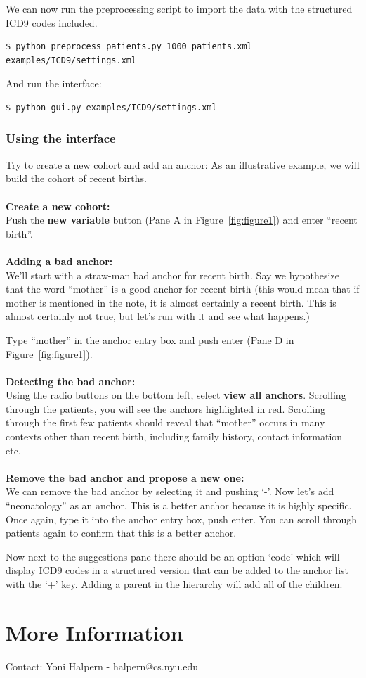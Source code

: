 \documentclass[12pt]{article}
\begin{document}
We can now run the preprocessing script to import the data with the structured ICD9 codes included.

\begin{verbatim}
$ python preprocess_patients.py 1000 patients.xml examples/ICD9/settings.xml
\end{verbatim}

And run the interface:
\begin{verbatim}
$ python gui.py examples/ICD9/settings.xml
\end{verbatim}

\subsubsection{Using the interface}
Try to create a new cohort and add an anchor:
As an illustrative example, we will build the cohort of recent births.\\
\\
{\bf Create a new cohort:}\\
Push the {\bf new variable} button (Pane A in Figure~\ref{fig:figure1}) and enter ``recent birth''.\\
\\
{\bf Adding a bad anchor:}\\
We'll start with a straw-man bad anchor for recent birth. Say we hypothesize that the word ``mother'' is a good anchor for recent birth (this would mean that if mother is mentioned in the note, it is almost certainly a recent birth. This is almost certainly not true, but let's run with it and see what happens.)

Type ``mother'' in the anchor entry box and push enter (Pane D in Figure~\ref{fig:figure1}).\\
\\
{\bf Detecting the bad anchor:}\\
Using the radio buttons on the bottom left, select {\bf view all anchors}. Scrolling through the patients, you will see the anchors highlighted in red. Scrolling through the first few patients should reveal that ``mother'' occurs in many contexts other than recent birth, including family history, contact information etc.\\
\\
{\bf Remove the bad anchor and propose a new one:}\\
We can remove the bad anchor by selecting it and pushing `-'. Now let's add ``neonatology'' as an anchor. This is a better anchor because it is highly specific. Once again, type it into the anchor entry box, push enter. You can scroll through patients again to confirm that this is a better anchor.






Now next to the suggestions pane there should be an option `code' which will display ICD9 codes in a structured version that can be added to the anchor list with the `+' key. Adding a parent in the hierarchy will add all of the children.

\section{More Information}
Contact: Yoni Halpern - halpern@cs.nyu.edu
\end{document}
